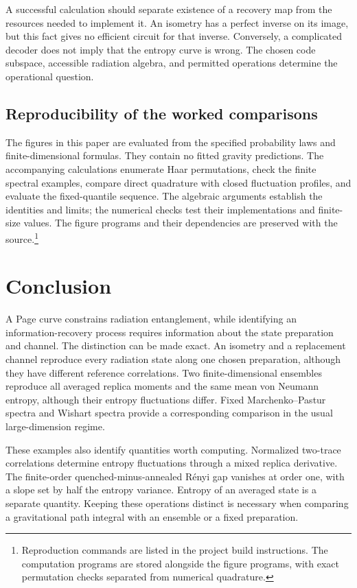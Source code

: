 \documentclass[11pt,letterpaper]{article}
\theoremstyle{plain}
\theoremstyle{definition}
\theoremstyle{remark}
\begin{document}
A successful calculation should separate existence of a recovery map
from the resources needed to implement it. An isometry has a perfect
inverse on its image, but this fact gives no efficient circuit for
that inverse. Conversely, a complicated decoder does not imply that
the entropy curve is wrong. The chosen code subspace, accessible
radiation algebra, and permitted operations determine the operational
question.

\subsection{Reproducibility of the worked comparisons}

The figures in this paper are evaluated from the specified probability
laws and finite-dimensional formulas. They contain no fitted gravity
predictions. The accompanying calculations enumerate Haar permutations,
check the finite spectral examples, compare direct quadrature with
closed fluctuation profiles, and evaluate the fixed-quantile sequence.
The algebraic arguments establish the identities and limits; the
numerical checks test their implementations and finite-size values.
The figure programs and their dependencies are preserved with the
source.\footnote{Reproduction commands are listed in the project build
instructions. The computation programs are stored alongside the figure
programs, with exact permutation checks separated from numerical
quadrature.}

\section{Conclusion}
\label{sec10:conclusion}

A Page curve constrains radiation entanglement, while identifying an
information-recovery process requires information about the state
preparation and channel. The distinction can be made exact. An
isometry and a replacement channel reproduce every radiation state
along one chosen preparation, although they have different reference
correlations. Two finite-dimensional ensembles reproduce all averaged
replica moments and the same mean von Neumann entropy, although their
entropy fluctuations differ. Fixed Marchenko--Pastur spectra and
Wishart spectra provide a corresponding comparison in the usual
large-dimension regime.

These examples also identify quantities worth computing. Normalized
two-trace correlations determine entropy fluctuations through a mixed
replica derivative. The finite-order quenched-minus-annealed R\'enyi
gap vanishes at order one, with a slope set by half the entropy
variance. Entropy of an averaged state is a separate quantity. Keeping
these operations distinct is necessary when comparing a gravitational
path integral with an ensemble or a fixed preparation.
\end{document}
